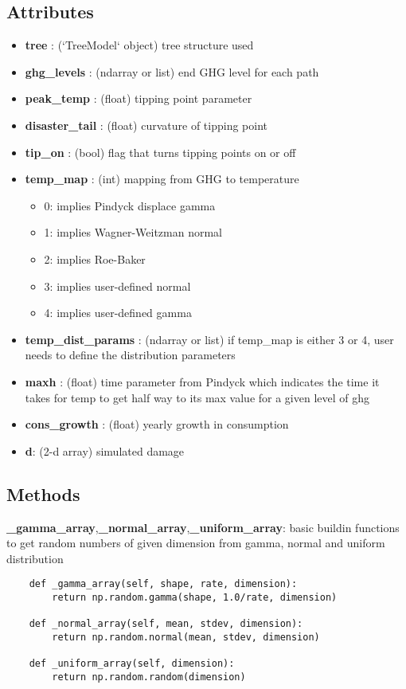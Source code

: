 \documentclass[12pt]{article}
\begin{document}
\subsection{Attributes}
    \begin{itemize}
      \item \textbf{tree} : (`TreeModel` object)
        tree structure used
      \item   \textbf{ghg\_levels} : (ndarray or list)
        end GHG level for each path
      \item     \textbf{peak\_temp} : (float)
        tipping point parameter
      \item    \textbf{disaster\_tail} : (float)
        curvature of tipping point
      \item     \textbf{tip\_on} : (bool)
        flag that turns tipping points on or off
      \item     \textbf{temp\_map} : (int)
        mapping from GHG to temperature
        \begin{itemize}
          \item 0: implies Pindyck displace gamma
          \item 1: implies Wagner-Weitzman normal
          \item 2: implies Roe-Baker
          \item 3: implies user-defined normal
          \item 4: implies user-defined gamma
        \end{itemize}
      \item     \textbf{temp\_dist\_params} : (ndarray or list)
        if temp\_map is either 3 or 4, user needs to define the distribution parameters
      \item     \textbf{maxh} : (float)
        time parameter from Pindyck which indicates the time it takes for temp to get half way to its max value for a given level of ghg
      \item     \textbf{cons\_growth} : (float)
        yearly growth in consumption
      \item \textbf{d}: (2-d array) simulated damage
    \end{itemize}
\subsection{Methods}
\textbf{\_gamma\_array},\textbf{\_normal\_array},\textbf{\_uniform\_array}: basic buildin functions to get random numbers of given dimension from gamma, normal and uniform distribution
\begin{verbatim}
    def _gamma_array(self, shape, rate, dimension):
        return np.random.gamma(shape, 1.0/rate, dimension)

    def _normal_array(self, mean, stdev, dimension):
        return np.random.normal(mean, stdev, dimension)

    def _uniform_array(self, dimension):
        return np.random.random(dimension)
\end{verbatim}
\end{document}
